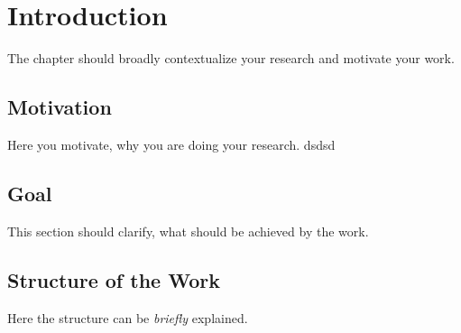 \chapter{Introduction}
\label{sec:introduction}
The chapter should broadly contextualize your research and motivate your work.

\section{Motivation}
Here you motivate, why you are doing your research. dsdsd

\section{Goal}
This section should clarify, what should be achieved by the work.

\section{Structure of the Work}
Here the structure can be \emph{briefly} explained.

